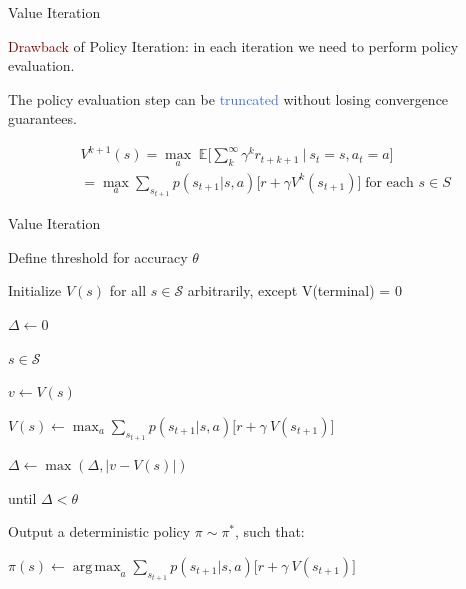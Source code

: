 \documentclass{beamer}
\DeclareMathOperator*{\argmax}{arg\,max}
\begin{document}
\begin{frame}{Value Iteration}

\textcolor{Maroon}{Drawback} of Policy Iteration: in each iteration we need to perform policy evaluation.

\vspace{2mm}

The policy evaluation step can be \textcolor{RoyalBlue}{truncated} without losing convergence guarantees.

\begin{align*}
    &V^{k+1}(s) = \max_a \;  \mathds{E} \bigg[\sum_{k}^{\infty}\gamma^{k} r_{t+k+1} \: \bigg| \: s_t=s, a_t = a \bigg] \\
		   & = \max_a \sum_{s_{t+1}} p(s_{t+1}|s,a)\big[r + \gamma V^{k}(s_{t+1}) \big] \; \text{for each } s \in S
\end{align*}


\end{frame}


\begin{frame}{Value Iteration}


\begin{algorithm}[H]
\caption{Value Iteration Algorithm}


\vspace{1mm}

Define threshold for accuracy $\theta$

Initialize $V(s)$ for all $s \in \mathcal{S}$ arbitrarily, except V(terminal) = 0

\vspace{4mm}

 $\Delta \leftarrow 0$

 \textbf{}  \textbf{}
 
 \vspace{0.5mm}
 
 \hspace{6mm} \textbf{}  $s \in \mathcal{S}$ \textbf{}
 
   
   \hspace{15mm} $v \leftarrow V(s)$
   
   \hspace{15mm} $V(s) \leftarrow \max_a \sum_{s_{t+1}}p(s_{t+1}|s,a)\Big[r+\gamma\:V(s_{t+1})\Big]$
   
   \hspace{15mm} $\Delta \leftarrow \max(\Delta, |v - V(s)|)$
   
   until $\Delta < \theta$

   \vspace{4mm}

   Output a deterministic policy $\pi \sim \pi^{*}$, such that:
   
   $\pi(s) \leftarrow \argmax_a \sum_{s_{t+1}}p(s_{t+1}|s,a)\Big[r+\gamma\:V(s_{t+1})\Big]$
   

\end{algorithm}

\end{frame}
\end{document}
